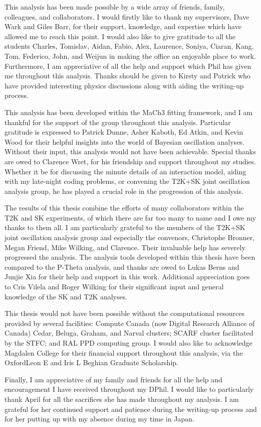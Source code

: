 This analysis has been made possible by a wide array of friends, family, colleagues, and collaborators. I would firstly like to thank my supervisors, Dave Wark and Giles Barr, for their support, knowledge, and expertise which have allowed me to reach this point. I would also like to give gratitude to all the students \textendash \vspace{1mm} Charles, Tomislav, Aidan, Fabio, Alex, Laurence, Soniya, Ciaran, Kang, Tom, Federico, John, and Weijun \textendash \vspace{1mm} in making the office an enjoyable place to work. Furthermore, I am appreciative of all the help and support which Phil has given me throughout this analysis. Thanks should be given to Kirsty and Patrick who have provided interesting physics discussions along with aiding the writing-up process. 

This analysis has been developed within the MaCh3 fitting framework, and I am thankful for the support of the group throughout this analysis. Particular gratitude is expressed to Patrick Dunne, Asher Kaboth, Ed Atkin, and Kevin Wood for their helpful insights into the world of Bayesian oscillation analyses. Without their input, this analysis would not have been achievable. Special thanks are owed to Clarence Wret, for his friendship and support throughout my studies. Whether it be for discussing the minute details of an interaction model, aiding with my late-night coding problems, or convening the T2K+SK joint oscillation analysis group, he has played a crucial role in the progression of this analysis.

The results of this thesis combine the efforts of many collaborators within the T2K and SK experiments, of which there are far too many to name and I owe my thanks to them all. I am particularly grateful to the members of the T2K+SK joint oscillation analysis group and especially the convenors, Christophe Bronner, Megan Friend, Mike Wilking, and Clarence. Their invaluable help has severely progressed the analysis. The analysis tools developed within this thesis have been compared to the P-Theta analysis, and thanks are owed to Lukas Berns and Junjie Xia for their help and support in this work. Additional appreciation goes to Cris Vilela and Roger Wilking for their significant input and general knowledge of the SK and T2K analyses.

This thesis would not have been possible without the computational resources provided by several facilities: Compute Canada (now Digital Research Alliance of Canada) Cedar, Beluga, Graham, and Narval clusters; SCARF cluster facilitated by the STFC; and RAL PPD computing group. I would also like to acknowledge Magdalen College for their financial support throughout this analysis, via the Oxford\textendash Leon E and Iris L Beghian Graduate Scholarship.

Finally, I am appreciative of my family and friends for all the help and encouragement I have received throughout my DPhil. I would like to particularly thank April for all the sacrifices she has made throughout my analysis. I am grateful for her continued support and patience during the writing-up process and for her putting up with my absence during my time in Japan.
